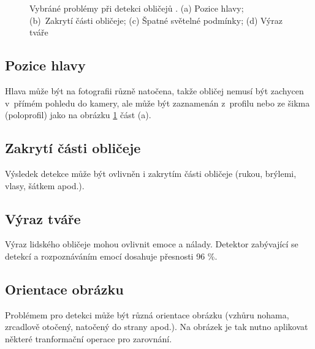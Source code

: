\begin{figure}[H]
  \begin{center}
  \label{fdproblems}
  \caption{Vybráné problémy při detekci obličejů \cite{frReview}. (a) Pozice hlavy; (b)~Zakrytí části obličeje; (c) Špatné světelné podmínky; (d) Výraz tváře}
  \end{center}
\end{figure}

\subsection*{Pozice hlavy}
Hlava může být na fotografii různě natočena, takže obličej nemusí být zachycen v~přímém pohledu do kamery, ale může být zaznamenán z~profilu nebo ze šikma (poloprofil) jako na obrázku \ref{fdproblems} část (a).

\subsection*{Zakrytí části obličeje}
Výsledek detekce může být ovlivněn i zakrytím části obličeje (rukou, brýlemi, vlasy, šátkem apod.).

\subsection*{Výraz tváře}
Výraz lidského obličeje mohou ovlivnit emoce a nálady. Detektor \cite{emotionDetector} zabývající se detekcí a rozpoznáváním emocí dosahuje přesnosti 96 \%.

\subsection*{Orientace obrázku}
Problémem pro detekci může být různá orientace obrázku (vzhůru nohama, zrcadlově otočený, natočený do strany apod.). Na obrázek je tak nutno aplikovat některé tranformační operace pro zarovnání.


